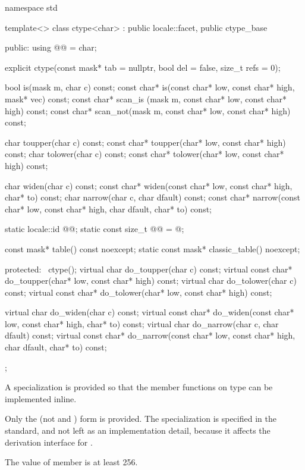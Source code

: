 %
\begin{codeblock}
namespace std {
  template<>
  class ctype<char> : public locale::facet, public ctype_base {
  public:
    using @@ = char;

    explicit ctype(const mask* tab = nullptr, bool del = false, size_t refs = 0);

    bool is(mask m, char c) const;
    const char* is(const char* low, const char* high, mask* vec) const;
    const char* scan_is (mask m, const char* low, const char* high) const;
    const char* scan_not(mask m, const char* low, const char* high) const;

    char        toupper(char c) const;
    const char* toupper(char* low, const char* high) const;
    char        tolower(char c) const;
    const char* tolower(char* low, const char* high) const;

    char  widen(char c) const;
    const char* widen(const char* low, const char* high, char* to) const;
    char  narrow(char c, char dfault) const;
    const char* narrow(const char* low, const char* high, char dfault, char* to) const;

    static locale::id @@;
    static const size_t @@ = @\impdef@;

    const mask* table() const noexcept;
    static const mask* classic_table() noexcept;

  protected:
    ~ctype();
    virtual char        do_toupper(char c) const;
    virtual const char* do_toupper(char* low, const char* high) const;
    virtual char        do_tolower(char c) const;
    virtual const char* do_tolower(char* low, const char* high) const;

    virtual char        do_widen(char c) const;
    virtual const char* do_widen(const char* low, const char* high, char* to) const;
    virtual char        do_narrow(char c, char dfault) const;
    virtual const char* do_narrow(const char* low, const char* high,
                                  char dfault, char* to) const;
  };
}
\end{codeblock}

\pnum
A specialization  is provided
so that the member functions on type  can be implemented inline.
\begin{footnote}
Only the  (not  and )
form is provided.
The specialization is specified in the standard,
and not left as an implementation detail,
because it affects the derivation interface for .
\end{footnote}
The  value of
member  is at least 256.

